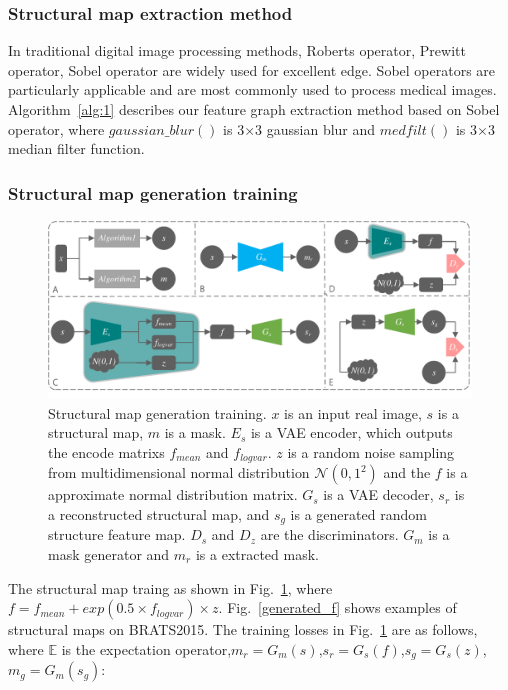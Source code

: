 \documentclass[runningheads]{llncs}
\begin{document}
	\subsubsection{Structural map extraction method}
	In traditional digital image processing methods, Roberts operator\cite{145Roberts}, Prewitt operator\cite{146prewitt}, Sobel operator\cite{147Sobel} are widely used for excellent edge. Sobel operators are particularly applicable and are most commonly used to process medical images. Algorithm~\ref{alg:1} describes our feature graph extraction method based on Sobel operator, where  $gaussian\_blur()$ is 3$\times$3 gaussian blur and  $medfilt()$ is 3$\times$3 median filter function.
	\subsubsection{Structural map generation training}
	\begin{figure}
		\centering
		\includegraphics[width=0.98\columnwidth]{figures/feature_train}
		\caption{Structural map generation training. $x$ is an input real image, $s$ is a structural map, $m$ is a mask. $E_s$ is a VAE encoder, which outputs the encode matrixs $f_{mean}$ and $f_{logvar}$. $z$ is a random noise sampling from multidimensional normal distribution $\mathcal{N}(0,1^2)$ and the $f$ is a approximate normal distribution matrix. $G_s$ is a VAE decoder, $s_r$ is a reconstructed structural map, and $s_g$ is a generated random structure feature map. $D_{s}$ and $D_{z}$ are the discriminators. $G_m$ is a mask generator and $m_r$ is a extracted mask. }
		\label{feature_train}
	\end{figure}
	The structural map traing as shown in Fig.~\ref{feature_train}, where $f=f_{mean}+exp(0.5\times f_{logvar})\times z$. Fig.~\ref{generated_f} shows examples of structural maps on BRATS2015. The training losses in Fig.~\ref{feature_train} are as follows, where $\mathbb{E}$ is the expectation operator,$m_r=G_m(s)$,$s_r=G_s(f)$,$s_g=G_s(z)$,$m_g=G_m(s_g)$: 
\end{document}
